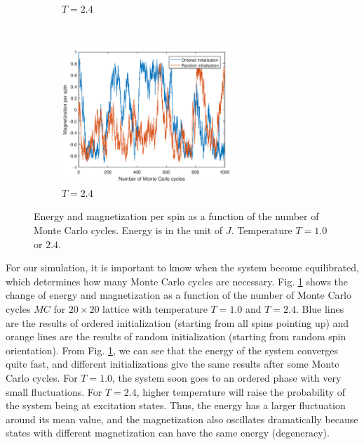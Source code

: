 \begin{figure}[tb]
\begin{subfigure}[tb]{0.5\textwidth}
		\caption{$T=2.4$}
	\end{subfigure}
	~
	\begin{subfigure}[tb]{0.5\textwidth}
		\centering
		\includegraphics[width=0.7\textwidth]{Process_mag_highT.eps}		
		\caption{$T=2.4$}
	\end{subfigure}
	\caption{Energy and magnetization per spin as a function of the number of Monte Carlo cycles. 
	Energy is in the unit of $J$. Temperature $T=1.0$ or $2.4$. }
	\label{fig:process}
\end{figure}
For our simulation, it is important to know when the system become equilibrated, 
which determines how many Monte Carlo cycles are necessary. 
Fig. \ref{fig:process} shows the change of energy and magnetization as a function of the number of Monte Carlo cycles $MC$ 
for $20 \times 20$ lattice with temperature $T=1.0$ and $T=2.4$. 
Blue lines are the results of ordered initialization (starting from all spins pointing up) 
and orange lines are the results of random initialization (starting from random spin orientation). 
From Fig. \ref{fig:process}, we can see that the energy of the system converges quite fast, 
and different initializations give the same results after some Monte Carlo cycles. 
For $T=1.0$, the system soon goes to an ordered phase with very small fluctuations. 
For $T=2.4$, higher temperature will raise the probability of the system being at excitation states. 
Thus, the energy has a larger fluctuation around its mean value, 
and the magnetization also oscillates dramatically 
because states with different magnetization can have the same energy (degeneracy). 
\par
